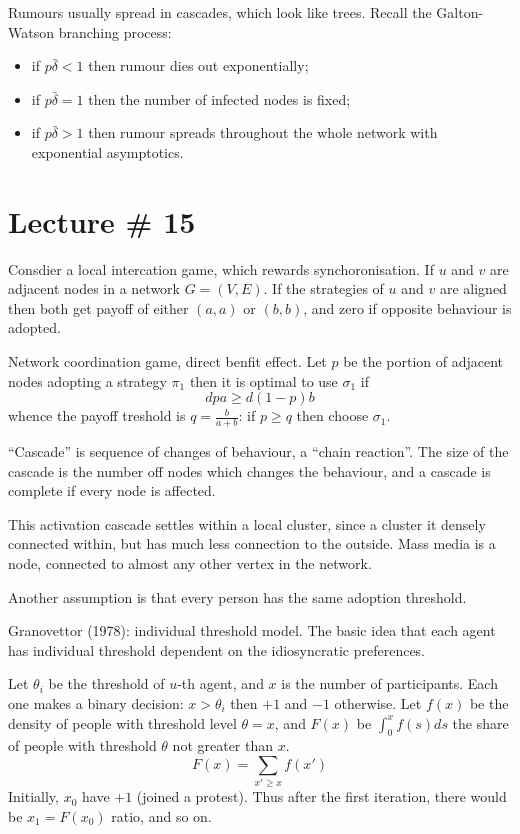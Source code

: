 \documentclass[a4paper]{article}
\begin{document}
Rumours usually spread in cascades, which look like trees. Recall the Galton-Watson
branching process: \begin{itemize}
	\item if $p \bar{\delta} < 1$ then rumour dies out exponentially;
	\item if $p \bar{\delta} = 1$ then the number of infected nodes is fixed;
	\item if $p \bar{\delta} > 1$ then rumour spreads throughout the whole network
	with exponential asymptotics.
\end{itemize}



\section{Lecture \# 15} %
\label{sec:lecture_15}

Consdier a local intercation game, which rewards synchoronisation. If $u$ and $v$
are adjacent nodes in a network $G = (V,E)$. If the strategies of $u$ and $v$ are
aligned then both get payoff of either $(a,a)$ or $(b,b)$, and zero if opposite
behaviour is adopted.

Network coordination game, direct benfit effect. Let $p$ be the portion of adjacent
nodes adopting a strategy $\pi_1$ then it is optimal to use $\sigma_1$ if
\[ d p a \geq d (1-p) b\]
whence the payoff treshold is $q=\frac{b}{a+b}$: if $p\geq q$ then choose $\sigma_1$.

``Cascade'' is sequence of changes of behaviour, a ``chain reaction''. The size of the
cascade is the number off nodes which changes the behaviour, and a cascade is complete
if every node is affected.

This activation cascade settles within a local cluster, since a cluster it densely
connected within, but has much less connection to the outside.
Mass media is a node, connected to almost any other vertex in the network.

Another assumption is that every person has the same adoption threshold.

Granovettor (1978): individual threshold model. The basic idea that each agent has
individual threshold dependent on the idiosyncratic preferences.

Let $\theta_i$ be the threshold of $u$-th agent, and $x$ is the number of participants.
Each one makes a binary decision: $x>\theta_i$ then $+1$ and $-1$ otherwise.
Let $f(x)$ be the density of people with threshold level $\theta=x$, and $F(x)$ be
$\int_0^x f(s) ds$ the share of people with threshold $\theta$ not greater than $x$.
\[F(x) = \sum_{x'\geq x} f(x')\]
Initially, $x_0$ have $+1$ (joined a protest). Thus after the first iteration, there
would be $x_1 = F(x_0)$ ratio, and so on.
\end{document}
